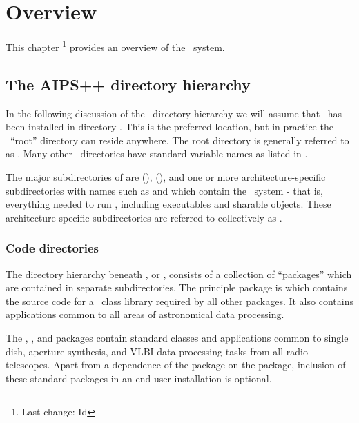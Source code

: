 \chapter{Overview}
\label{Overview}


This chapter \footnote{Last change:
$ $Id$ $}
provides an overview of the \aipspp\ system.


\section{The AIPS++ directory hierarchy}
\label{Directories}

In the following discussion of the \aipspp\ directory hierarchy we will
assume that \aipspp\ has been installed in directory .  This
is the preferred location, but in practice the \aipspp\ ``root'' directory
can reside anywhere.  The root directory is generally referred to as
.  Many other \aipspp\ directories have standard variable
names as listed in .

The major subdirectories of  are  (),
 (), and one or more architecture-specific
subdirectories with names such as  and 
which contain the \aipspp\ system - that is, everything needed to run \aipspp,
including executables and sharable objects.  These architecture-specific
subdirectories are referred to collectively as .


\subsection{Code directories}
\label{Code directories}

The directory hierarchy beneath , or ,
consists of a collection of ``packages'' which are contained in separate
subdirectories.  The principle package is  which
contains the source code for a \cplusplus\ class library required by all other
packages.  It also contains applications common to all areas of astronomical
data processing.

The , , and  packages contain standard
classes and applications common to single dish, aperture synthesis, and VLBI
data processing tasks from all radio telescopes.  Apart from a dependence of
the  package on the  package, inclusion of these
standard packages in an end-user installation is optional.

